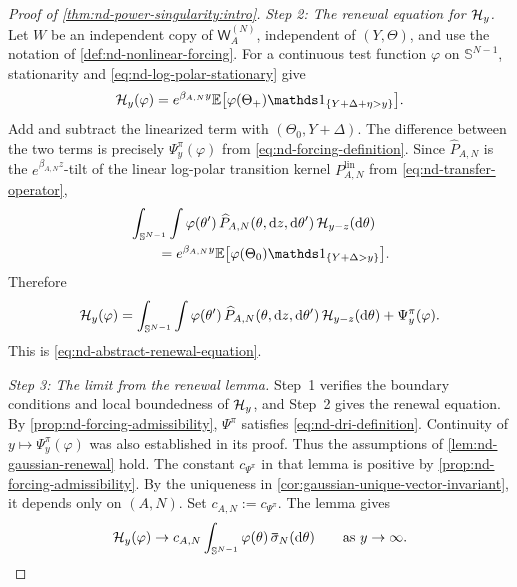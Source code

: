 \documentclass[11pt,reqno,a4paper]{article}
\newcommand{\Ee}{\E}
\begin{document}
\begin{proof}[Proof of \cref{thm:nd-power-singularity:intro}]
  \emph{Step 2: The renewal equation for $\mathcal H_y$.}
  Let $W$ be an independent copy of
  $\mathsf W_A^{(N)}$, independent of $(Y,\Theta)$, and use the notation of
  \cref{def:nd-nonlinear-forcing}.
  For a continuous test function $\varphi$ on $\mathbb S^{N-1}$,
  stationarity and \cref{eq:nd-log-polar-stationary} give
  \begin{equation}\label{eq:nd-tail-stationarity}
    \Hcal_y(\varphi)
    =
    e^{\beta_{A,N}y}
    \Ee\left[
      \varphi(\Theta_+)
      \one_{\{Y+\Delta+\eta>y\}}
    \right].
  \end{equation}
  Add and subtract the linearized term with $(\Theta_0,Y+\Delta)$. The difference
  between the two terms is precisely
  $\Psi_y^\pi(\varphi)$ from \cref{eq:nd-forcing-definition}.
  Since $\widehat P_{A,N}$ is the $e^{\beta_{A,N}z}$-tilt of the linear
  log-polar transition kernel $P_{A,N}^{\mathrm{lin}}$ from
  \cref{eq:nd-transfer-operator},
  \begin{equation*}
    \begin{split}
    &\int_{\mathbb S^{N-1}}
    \int
    \varphi(\theta')\,
    \widehat P_{A,N}(\theta,\mathrm{d}z,\mathrm{d}\theta')\,
    \Hcal_{y-z}(\mathrm{d}\theta)
    \\
    &\qquad =
    e^{\beta_{A,N}y}
    \Ee\left[
      \varphi(\Theta_0)
      \one_{\{Y+\Delta>y\}}
    \right].
    \end{split}
  \end{equation*}
  Therefore
  \begin{equation}\label{eq:nd-renewal-equation}
    \mathcal H_y(\varphi)
    =
    \int_{\mathbb S^{N-1}}
    \int
    \varphi(\theta')\,
    \widehat P_{A,N}(\theta,\mathrm{d}z,\mathrm{d}\theta')\,
    \mathcal H_{y-z}(\mathrm{d}\theta)
    +
    \Psi_y^\pi(\varphi).
  \end{equation}
  This is \cref{eq:nd-abstract-renewal-equation}.

  \emph{Step 3: The limit from the renewal lemma.}
  Step~1 verifies the boundary conditions and local boundedness of $\mathcal H_y$,
  and Step~2 gives the renewal equation. By
  \cref{prop:nd-forcing-admissibility}, $\Psi^\pi$ satisfies
  \cref{eq:nd-dri-definition}. Continuity of
  $y\mapsto\Psi_y^\pi(\varphi)$ was also established in its proof. Thus the
  assumptions of \cref{lem:nd-gaussian-renewal} hold. The constant
  $c_{\Psi^\pi}$ in that lemma is positive by
  \cref{prop:nd-forcing-admissibility}. By the uniqueness in
  \cref{cor:gaussian-unique-vector-invariant}, it depends only on $(A,N)$.
  Set $c_{A,N}:=c_{\Psi^\pi}$. The lemma gives
  \begin{equation}\label{eq:nd-weighted-renewal-limit}
    \Hcal_y(\varphi)
    \to
    c_{A,N}
    \int_{\mathbb S^{N-1}}\varphi(\theta)\,
    \bar\sigma_N(\mathrm{d}\theta)
    \qquad \mbox{as } y\to\infty .
  \end{equation}


\end{proof}
\end{document}
